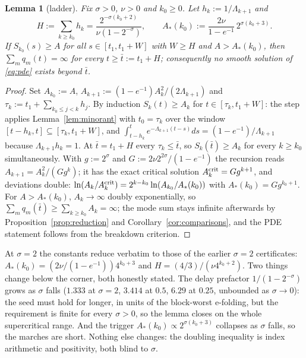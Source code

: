\documentclass[11pt,a4paper]{article}
\theoremstyle{plain}
\newtheorem{lemma}[theorem]{Lemma}
\theoremstyle{definition}
\begin{document}
\begin{lemma}[ladder]\label{lem:ladder}
Fix $\sigma>0$, $\nu>0$ and $k_0\ge0$. Let $h_k:=1/\Lambda_{k+1}$ and
\[
H:=\sum_{k\ge k_0}h_k=\frac{2^{-\sigma(k_0+2)}}{\nu(1-2^{-\sigma})},\qquad A_*(k_0):=\frac{2\nu}{1-e^{-1}}\,2^{\sigma(k_0+3)}.
\]
If $S_{k_0}(s)\ge A$ for all $s\in[t_1,t_1+W]$ with $W\ge H$ and $A>A_*(k_0)$, then $\sum_mq_m(t)=\infty$ for every $t\ge\bar t:=t_1+H$; consequently no smooth solution of \eqref{eq:pde} exists beyond $\bar t$.
\end{lemma}
\begin{proof}
Set $A_{k_0}:=A$, $A_{k+1}:=(1-e^{-1})A_k^2/(2\Lambda_{k+1})$ and $\tau_k:=t_1+\sum_{k_0\le j<k}h_j$. By induction $S_k(t)\ge A_k$ for $t\in[\tau_k,t_1+W]$: the step applies Lemma~\ref{lem:minorant} with $t_0=\tau_k$ over the window $[t-h_k,t]\subseteq[\tau_k,t_1+W]$, and $\int_{t-h_k}^te^{-\Lambda_{k+1}(t-s)}ds=(1-e^{-1})/\Lambda_{k+1}$ because $\Lambda_{k+1}h_k=1$. At $\bar t=t_1+H$ every $\tau_k\le\bar t$, so $S_k(\bar t)\ge A_k$ for every $k\ge k_0$ simultaneously. With $g:=2^\sigma$ and $G:=2\nu2^{2\sigma}/(1-e^{-1})$ the recursion reads $A_{k+1}=A_k^2/(Gg^k)$; it has the exact critical solution $A_k^{\rm crit}=Gg^{k+1}$, and deviations double: $\ln(A_k/A_k^{\rm crit})=2^{k-k_0}\ln(A_{k_0}/A_*(k_0))$ with $A_*(k_0)=Gg^{k_0+1}$. For $A>A_*(k_0)$, $A_k\to\infty$ doubly exponentially, so $\sum_mq_m(\bar t)\ge\sum_{k\ge k_0}A_k=\infty$; the mode sum stays infinite afterwards by Proposition~\ref{prop:reduction} and Corollary~\ref{cor:comparisons}, and the PDE statement follows from the breakdown criterion.
\end{proof}
At $\sigma=2$ the constants reduce verbatim to those of the earlier $\sigma=2$ certificates: $A_*(k_0)=(2\nu/(1-e^{-1}))4^{k_0+3}$ and $H=(4/3)/(\nu4^{k_0+2})$. Two things change below the corner, both honestly stated. The delay prefactor $1/(1-2^{-\sigma})$ grows as $\sigma$ falls ($1.333$ at $\sigma=2$, $3.414$ at $0.5$, $6.29$ at $0.25$, unbounded as $\sigma\to0$): the seed must hold for longer, in units of the block-worst e-folding, but the requirement is finite for every $\sigma>0$, so the lemma closes on the whole supercritical range. And the trigger $A_*(k_0)\propto2^{\sigma(k_0+3)}$ collapses as $\sigma$ falls, so the marches are short. Nothing else changes: the doubling inequality is index arithmetic and positivity, both blind to $\sigma$.
\end{document}
